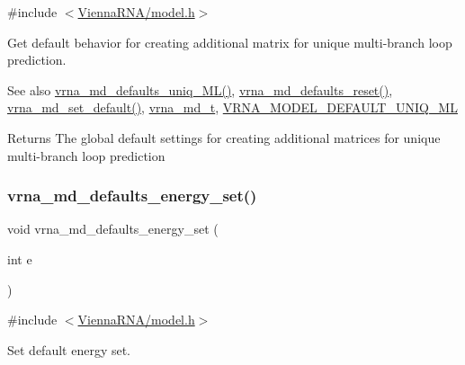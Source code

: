 {\ttfamily \#include $<$\hyperlink{model_8h}{Vienna\+R\+N\+A/model.\+h}$>$}



Get default behavior for creating additional matrix for unique multi-\/branch loop prediction. 

\begin{DoxySeeAlso}{See also}
\hyperlink{group__model__details_ga59b944f61c5d2babec2d4c48c820de67}{vrna\+\_\+md\+\_\+defaults\+\_\+uniq\+\_\+\+M\+L()}, \hyperlink{group__model__details_ga70834424cf804d149937de89f80ceb45}{vrna\+\_\+md\+\_\+defaults\+\_\+reset()}, \hyperlink{group__model__details_ga8ac6ff84936282436f822644bf841f66}{vrna\+\_\+md\+\_\+set\+\_\+default()}, \hyperlink{group__model__details_ga1f8a10e12a0a1915f2a4eff0b28ea17c}{vrna\+\_\+md\+\_\+t}, \hyperlink{group__model__details_ga63f6006a02ba2d89148441f406c309e7}{V\+R\+N\+A\+\_\+\+M\+O\+D\+E\+L\+\_\+\+D\+E\+F\+A\+U\+L\+T\+\_\+\+U\+N\+I\+Q\+\_\+\+ML} 
\end{DoxySeeAlso}
\begin{DoxyReturn}{Returns}
The global default settings for creating additional matrices for unique multi-\/branch loop prediction 
\end{DoxyReturn}
\mbox{\label{group__model__details_ga8dd29c55787a4576277e1907e92d810c}} 
\subsubsection{\texorpdfstring{vrna\+\_\+md\+\_\+defaults\+\_\+energy\+\_\+set()}{vrna\_md\_defaults\_energy\_set()}}
{\footnotesize\ttfamily void vrna\+\_\+md\+\_\+defaults\+\_\+energy\+\_\+set (\begin{DoxyParamCaption}\item[{int}]{e }\end{DoxyParamCaption})}



{\ttfamily \#include $<$\hyperlink{model_8h}{Vienna\+R\+N\+A/model.\+h}$>$}



Set default energy set. 

